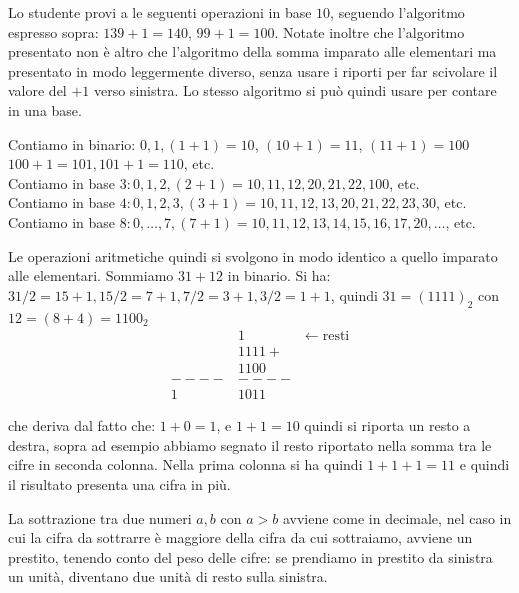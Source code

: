 Lo studente provi a le seguenti operazioni in base $10$, seguendo l'algoritmo
espresso sopra: $139+1 = 140$, $99+1 = 100$. Notate inoltre che l'algoritmo presentato non è altro che l'algoritmo della somma imparato alle elementari ma presentato in modo leggermente diverso, senza usare i riporti per far scivolare
il valore del $+1$ verso sinistra. Lo stesso algoritmo si può quindi usare per contare in una base.
\begin{ex}\label{ex:somma}
Contiamo in binario: $0, 1, (1+1) = 10$, $(10+1) = 11$, $(11+1) = 100$
$100+1 = 101, 101+1 = 110$, etc.\\
Contiamo in base $3: 0,1,2,(2+1)=10,11,12,20,21,22,100$, etc.\\
Contiamo in base $4: 0,1,2,3, (3+1) = 10, 11,12,13,20,21,22,23,30$, etc.\\
Contiamo in base $8: 0,\ldots,7, (7+1)=10,11,12,13,14,15,16,17,20,\ldots$, etc.

Le operazioni aritmetiche quindi si svolgono in modo identico a quello imparato
alle elementari. Sommiamo $31+12$ in binario. Si ha: $31/2 = 15 + 1, 15/2 = 7 + 1, 7/2 = 3 + 1, 3 /2 = 1 + 1$, quindi $31 = (1111)_2$ con $12 = (8+4) = 1100_2$
\begin{align*}
    &1\qquad \qquad \leftarrow\text{resti}\\
	&1111+\\
	&1100\\
----&----\\
   1&1011
\end{align*}
\end{ex}


che deriva dal fatto che: $1+0 = 1$, e $1+1 = 10$ quindi si riporta un resto
a destra, sopra ad esempio abbiamo segnato il resto riportato nella somma tra le cifre in seconda colonna. Nella prima colonna si ha quindi $1+1+1 = 11$ e quindi il risultato presenta una cifra in più.

La sottrazione tra due numeri $a,b$ con $a>b$
avviene come in decimale, nel caso in cui la cifra da sottrarre è maggiore
della cifra da cui sottraiamo, avviene un prestito, tenendo conto del peso
delle cifre: se prendiamo in prestito da sinistra un unità, diventano due unità
di resto sulla sinistra.

